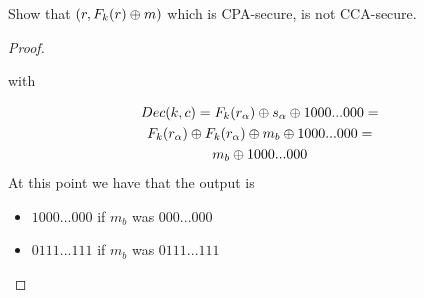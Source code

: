 \begin{exercise}
    Show that $(r, F_{k}(r) \oplus m)$ which is CPA-secure, is not CCA-secure.
\end{exercise}
\begin{proof}
    \begin{figure}[h!]
       \centering
       \sdinit{}
    \end{figure}
    with 
    
    \begin{gather*}
        Dec(k, c) =  F_{k}(r_{\alpha}) \oplus s_{\alpha} \oplus
        1000...000 =\\
        F_{k}(r_{\alpha}) \oplus F_{k}(r_{\alpha}) \oplus m_{b} \oplus
        1000...000 =\\
        m_{b} \oplus 1000...000 
    \end{gather*}
   At this point we have that the output is  
   \begin{itemize}
       \item $1000...000$ if $m_{b}$ was $000...000$
       \item $0111...111$ if $m_{b}$ was $0111...111$
   \end{itemize}
   
\end{proof}

